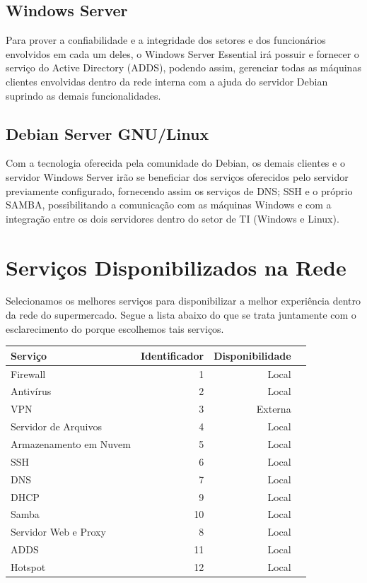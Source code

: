 \documentclass[12pt]{article}
\begin{document}
\subsection{Windows Server}
Para prover a confiabilidade e a integridade dos setores e dos funcionários envolvidos em cada um deles, o Windows Server Essential irá possuir e fornecer o serviço do Active Directory (ADDS), podendo assim, gerenciar todas as máquinas clientes envolvidas dentro da rede interna com a ajuda do servidor Debian suprindo as demais funcionalidades.

\subsection{Debian Server GNU/Linux}
Com a tecnologia oferecida pela comunidade do Debian, os demais clientes e o servidor Windows Server irão se beneficiar dos serviços oferecidos pelo servidor previamente configurado, fornecendo assim os serviços de DNS; SSH e o próprio SAMBA, possibilitando a comunicação com as máquinas Windows e com a integração entre os dois servidores dentro do setor de TI (Windows e Linux).

\section{Serviços Disponibilizados na Rede}
Selecionamos os melhores serviços para disponibilizar a melhor experiência dentro da rede do supermercado. Segue a lista abaixo do que se trata juntamente com o esclarecimento do porque escolhemos tais serviços.

\begin{center}
\begin{tabular}{| l | r | r | r |}
\hline
Serviço & Identificador & Disponibilidade\\
\hline
Firewall & 1 & Local\\
Antivírus & 2 & Local\\
VPN & 3 & Externa\\
Servidor de Arquivos & 4 & Local\\
Armazenamento em Nuvem & 5 & Local\\
SSH & 6 & Local\\
DNS & 7 & Local\\
DHCP & 9 & Local\\
Samba & 10 & Local\\
Servidor Web e Proxy & 8 & Local\\
ADDS & 11 & Local\\
Hotspot & 12 & Local\\
\hline
\end{tabular}
\end{center}
\end{document}
